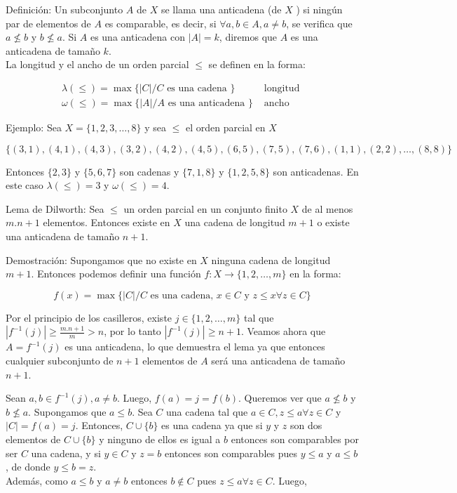 \documentclass[10pt]{article}
\begin{document}
Definición: Un subconjunto $A$ de $X$ se llama una anticadena (de $X$ ) si ningún par de elementos de $A$ es comparable, es decir, si $\forall a, b \in A, a \neq b$, se verifica que $a \not \leq b$ y $b \not \leq a$. Si $A$ es una anticadena con $|A|=k$, diremos que $A$ es una anticadena de tamaño $k$.\\
La longitud y el ancho de un orden parcial $\leq$ se definen en la forma:

$$
\begin{array}{lr}
\lambda(\leq)=\max \{|C| / C \text { es una cadena }\} & \text { longitud } \\
\omega(\leq)=\max \{|A| / A \text { es una anticadena }\} & \text { ancho }
\end{array}
$$

Ejemplo: Sea $X=\{1,2,3, \ldots, 8\}$ y sea $\leq$ el orden parcial en $X$

$$
\{(3,1),(4,1),(4,3),(3,2),(4,2),(4,5),(6,5),(7,5),(7,6),(1,1),(2,2), \ldots,(8,8)\}
$$

Entonces $\{2,3\}$ y $\{5,6,7\}$ son cadenas y $\{7,1,8\}$ y $\{1,2,5,8\}$ son anticadenas. En este caso $\lambda(\leq)=3$ y $\omega(\leq)=4$.

Lema de Dilworth: Sea $\leq$ un orden parcial en un conjunto finito $X$ de al menos $m . n+1$ elementos. Entonces existe en $X$ una cadena de longitud $m+1$ o existe una anticadena de tamaño $n+1$.

Demostración: Supongamos que no existe en $X$ ninguna cadena de longitud $m+1$. Entonces podemos definir una función $f: X \longrightarrow\{1,2, \ldots, m\}$ en la forma:

$$
f(x)=\max \{|C| / C \text { es una cadena, } x \in C \text { y } z \leq x \forall z \in C\}
$$

Por el principio de los casilleros, existe $j \in\{1,2, \ldots, m\}$ tal que $\left|f^{-1}(j)\right| \geq \frac{m . n+1}{m}>n$, por lo tanto $\left|f^{-1}(j)\right| \geq n+1$. Veamos ahora que $A=f^{-1}(j)$ es una anticadena, lo que demuestra el lema ya que entonces cualquier subconjunto de $n+1$ elementos de $A$ será una anticadena de tamaño $n+1$.

Sean $a, b \in f^{-1}(j), a \neq b$. Luego, $f(a)=j=f(b)$. Queremos ver que $a \not \leq b$ y $b \not \leq a$. Supongamos que $a \leq b$. Sea $C$ una cadena tal que $a \in C, z \leq a \forall z \in C$ y $|C|=f(a)=j$. Entonces, $C \cup\{b\}$ es una cadena ya que si $y$ y $z$ son dos elementos de $C \cup\{b\}$ y ninguno de ellos es igual a $b$ entonces son comparables por ser $C$ una cadena, y si $y \in C$ y $z=b$ entonces son comparables pues $y \leq a$ y $a \leq b$, de donde $y \leq b=z$.\\
Además, como $a \leq b$ y $a \neq b$ entonces $b \notin C$ pues $z \leq a \forall z \in C$. Luego,
\end{document}
